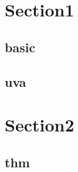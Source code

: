 \section{Section1}
    \subsection{basic}
        
    \subsection{uva}
    	

\section{Section2}
    \subsection{thm}
        